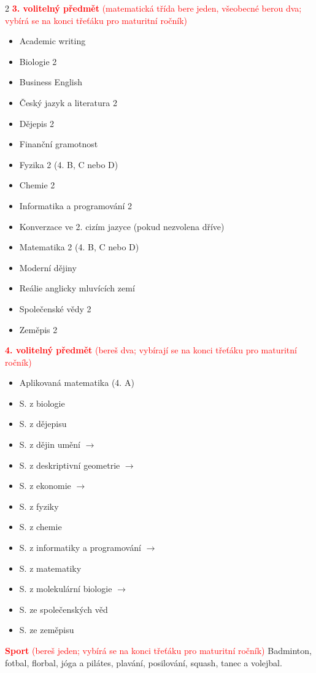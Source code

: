 \documentclass[a5paper, twoside]{article}
\begin{document}
\begin{multicols}{2}
	\noindent \textcolor{red}{\textbf{3. volitelný předmět} (matematická třída bere jeden, všeobecné berou dva; vybírá se na konci třeťáku pro maturitní ročník)}
	\begin{itemize}
    \item Academic writing
		\item Biologie 2
		\item Business English
    \item Český jazyk a literatura 2
		\item Dějepis 2
		\item Finanční gramotnost
		\item Fyzika 2 (4. B, C nebo D)
		\item Chemie 2
		\item Informatika a programování 2
		\item Konverzace ve 2. cizím jazyce
		      (pokud nezvolena dříve)
		\item Matematika 2 (4. B, C nebo D)
		\item Moderní dějiny
    \item Reálie anglicky mluvících zemí
    \item Společenské vědy 2
		\item Zeměpis 2
	\end{itemize}

	\noindent \textcolor{red}{\textbf{4. volitelný předmět} (bereš dva; vybírají se na konci třeťáku pro maturitní ročník)}
	\begin{itemize}
    \item Aplikovaná matematika (4. A)
		\item S. z biologie
		\item S. z dějepisu
    \item S. z dějin umění $\rightarrow$
		\item S. z deskriptivní geometrie $\rightarrow$
		\item S. z ekonomie $\rightarrow$
		\item S. z fyziky
		\item S. z chemie
		\item S. z informatiky a programování $\rightarrow$
		\item S. z matematiky
		\item S. z molekulární biologie $\rightarrow$
		\item S. ze společenských věd
		\item S. ze zeměpisu
	\end{itemize}

	\noindent \textcolor{red}{\textbf{Sport} (bereš jeden; vybírá se na konci třeťáku pro maturitní ročník)}
	\newline Badminton, fotbal, florbal, jóga a pilátes, plavání, posilování, squash, tanec a volejbal.


\end{multicols}
\end{document}
